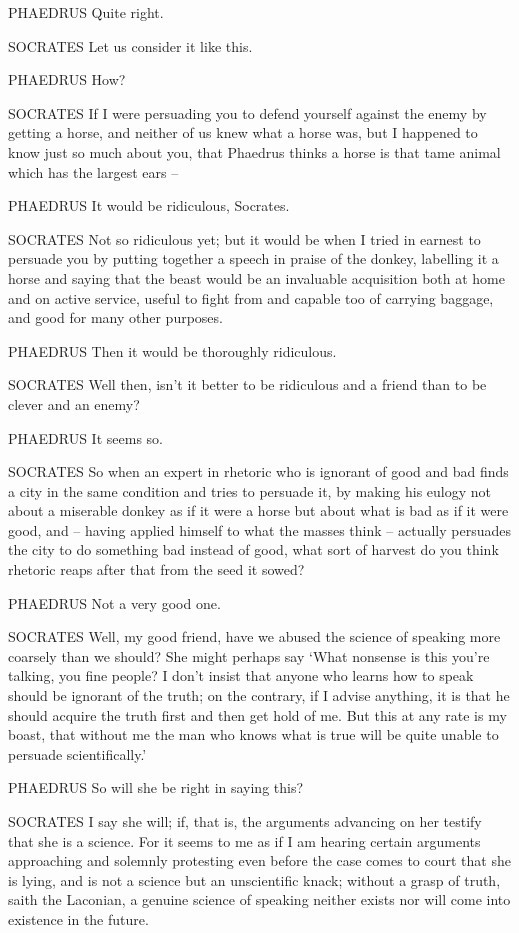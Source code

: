 PHAEDRUS Quite right.

SOCRATES Let us consider it like this.

 PHAEDRUS How?

SOCRATES If I were persuading you to defend yourself against the enemy
by getting a horse, and neither of us knew what a horse was, but I
happened to know just so much about you, that Phaedrus thinks a horse is
that tame animal which has the largest ears --

PHAEDRUS It would be ridiculous, Socrates. 

SOCRATES Not so ridiculous yet; but it would be when I tried in earnest
to persuade you by putting together a speech in praise of the donkey,
labelling it a horse and saying that the beast would be an invaluable
acquisition both at home and on active  service, useful to fight
from and capable too of carrying baggage, and good for many other
purposes.

PHAEDRUS Then it would be thoroughly ridiculous.

SOCRATES Well then, isn't it better to be ridiculous and a friend than
to be clever and an enemy?

PHAEDRUS It seems so. 

SOCRATES So when an expert in rhetoric who is ignorant of good and bad
finds a city in the same condition and tries to persuade it, by making
his eulogy not about a miserable donkey as if it were a horse but about
what is bad as if it were good, and -- having applied himself to what
the masses think -- actually persuades the city to do something bad
instead of good, what  sort of harvest do you think rhetoric
reaps after that from the  seed it sowed?

PHAEDRUS Not a very good one.

SOCRATES Well, my good friend, have we abused the science of speaking
more coarsely than we should? She might perhaps say ‘What nonsense is
this you're talking, you fine people?  I don't insist that
anyone who learns how to speak should be ignorant of the truth; on the
contrary, if I advise anything, it is that he should acquire the truth
first and then get hold of me. But this at any rate is my boast, that
without me the man who knows what is true will be quite unable to
persuade scientifically.'

PHAEDRUS So will she be right in saying this? 

SOCRATES I say she will; if, that is, the
arguments advancing on
her testify that she is a science. For it seems to me as if I am hearing
certain arguments approaching and solemnly protesting even before the
case comes to court that she is lying, and is not a science but an
unscientific knack; without a grasp of truth,  saith the
Laconian, a genuine
science of speaking neither exists nor will come into existence in the
future.

